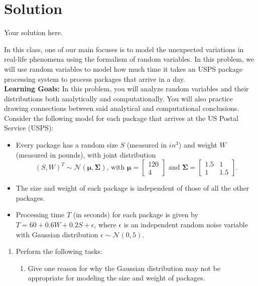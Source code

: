 \documentclass{../harvardml}
\theoremstyle{definition}
\theoremstyle{plain}
\newenvironment{solution}
  {\color{blue}\section*{Solution}}
{}
\begin{document}
\newpage


\begin{solution}
	Your solution here.
\end{solution}

\newpage 


\begin{problem}
In this class, one of our main focuses is to model the unexpected variations in real-life phenomena using the formalism of random variables. In this problem, we will use random variables to model how much time it takes an USPS package processing system to process packages that arrive in a day.\\

\noindent \textbf{Learning Goals:} In this problem, you will analyze random variables and their distributions both analytically and computationally. You will also practice drawing connections between said analytical and computational conclusions.\\

\noindent Consider the following model for each package that arrives at the US Postal Service (USPS):
\begin{itemize}
    \item Every package has a random size $S$ (measured in $in^3$) and weight $W$ (measured in pounds), with joint distribution
    $$(S, W)^{T} \sim \mathcal{N}\left( \boldsymbol{\mu}, \boldsymbol{\Sigma}\right) \text{, with } \boldsymbol{\mu} = \begin{bmatrix} 120 \\ 4 \end{bmatrix} \text{ and } \boldsymbol{\Sigma} = \begin{bmatrix} 1.5 & 1 \\ 1 & 1.5 \end{bmatrix}.$$ 
    \item The size and weight of each package is independent of those of all the other packages.
    \item Processing time $T$ (in seconds) for each package is given by $T = 60 + 0.6 W + 0.2 S + \epsilon$, where $\epsilon$ is an independent random noise variable with Gaussian distribution $\epsilon \sim \mathcal{N}(0, 5)$.
\end{itemize}

\begin{enumerate}
    \item Perform the following tasks:
    \begin{enumerate}
        \item Give one reason for why the Gaussian distribution may not be appropriate for modeling the size and weight of packages.
        

\end{enumerate}
\end{enumerate}
\end{problem}
\end{document}
